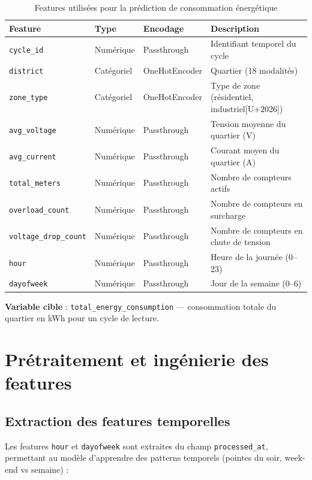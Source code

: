 \documentclass[12pt,a4paper]{report}
\begin{document}
\begin{table}[H]
\centering
\caption{Features utilis\'{e}es pour la pr\'{e}diction de consommation \'{e}nerg\'{e}tique}
\label{tab:ml_features}
\renewcommand{\arraystretch}{1.3}
\begin{tabularx}{\textwidth}{|l|l|l|X|}
\hline
\rowcolor{primaryblue!20}
\textbf{Feature} & \textbf{Type} & \textbf{Encodage} & \textbf{Description} \\
\hline
\texttt{cycle\_id} & Num\'{e}rique & Passthrough & Identifiant temporel du cycle \\
\texttt{district} & Cat\'{e}goriel & OneHotEncoder & Quartier (18 modalit\'{e}s) \\
\texttt{zone\_type} & Cat\'{e}goriel & OneHotEncoder & Type de zone (r\'{e}sidentiel, industriel[U+2026]) \\
\texttt{avg\_voltage} & Num\'{e}rique & Passthrough & Tension moyenne du quartier (V) \\
\texttt{avg\_current} & Num\'{e}rique & Passthrough & Courant moyen du quartier (A) \\
\texttt{total\_meters} & Num\'{e}rique & Passthrough & Nombre de compteurs actifs \\
\texttt{overload\_count} & Num\'{e}rique & Passthrough & Nombre de compteurs en surcharge \\
\texttt{voltage\_drop\_count} & Num\'{e}rique & Passthrough & Nombre de compteurs en chute de tension \\
\texttt{hour} & Num\'{e}rique & Passthrough & Heure de la journ\'{e}e (0--23) \\
\texttt{dayofweek} & Num\'{e}rique & Passthrough & Jour de la semaine (0--6) \\
\hline
\end{tabularx}
\end{table}

\textbf{Variable cible} : \texttt{total\_energy\_consumption} --- consommation totale du quartier en kWh pour un cycle de lecture.

\section{Pr\'{e}traitement et ing\'{e}nierie des features}

\subsection{Extraction des features temporelles}

Les features \texttt{hour} et \texttt{dayofweek} sont extraites du champ \texttt{processed\_at}, permettant au mod\`{e}le d'apprendre des patterns temporels (pointes du soir, week-end vs semaine) :
\end{document}
